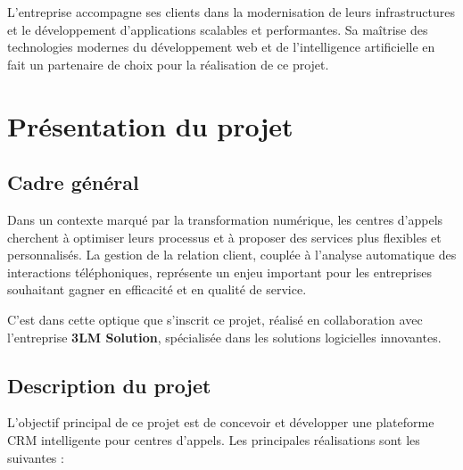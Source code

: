 L'entreprise accompagne ses clients dans la modernisation de leurs infrastructures et le
développement d'applications scalables et performantes. Sa maîtrise des technologies modernes
du développement web et de l'intelligence artificielle en fait un partenaire de choix pour
la réalisation de ce projet.

\section{Présentation du projet}
\label{sec:chap1_presentation_projet}

\subsection{Cadre général}

Dans un contexte marqué par la transformation numérique, les centres d'appels cherchent à
optimiser leurs processus et à proposer des services plus flexibles et personnalisés. La
gestion de la relation client, couplée à l'analyse automatique des interactions téléphoniques,
représente un enjeu important pour les entreprises souhaitant gagner en efficacité et en
qualité de service.

C'est dans cette optique que s'inscrit ce projet, réalisé en collaboration avec l'entreprise
\textbf{3LM Solution}, spécialisée dans les solutions logicielles innovantes.

\subsection{Description du projet}

L'objectif principal de ce projet est de concevoir et développer une plateforme CRM
intelligente pour centres d'appels. Les principales réalisations sont les suivantes :

